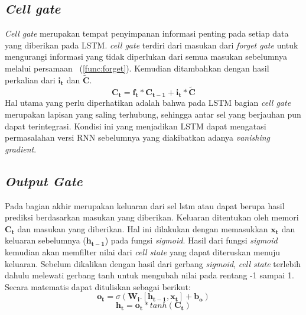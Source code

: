 \subsection{\textit{Cell gate}}
\textit{Cell gate} merupakan tempat penyimpanan informasi penting pada setiap data yang diberikan pada LSTM. \textit{cell gate} terdiri dari masukan dari \textit{forget gate} untuk mengurangi informasi yang tidak diperlukan dari semua masukan sebelumnya melalui persamaan ~(\ref{func:forget}). Kemudian ditambahkan dengan hasil perkalian dari $\boldsymbol{i_t}$ dan $\boldsymbol{\tilde{C}}$.
\begin{equation}
	\boldsymbol{C_t} = \boldsymbol{f_t}*\boldsymbol{C_{t-1}} + \boldsymbol{i_t} * \boldsymbol{\tilde{C}}
	\label{func:cell_gate}
\end{equation}
Hal utama yang perlu diperhatikan adalah bahwa pada LSTM bagian \textit{cell gate} merupakan lapisan yang saling terhubung, sehingga antar sel yang berjauhan pun dapat terintegrasi. Kondisi ini yang menjadikan LSTM dapat mengatasi permasalahan versi RNN sebelumnya yang diakibatkan adanya \textit{vanishing gradient}.
\subsection{\textit{Output Gate}}
Pada bagian akhir merupakan keluaran dari sel lstm atau dapat berupa hasil prediksi berdasarkan masukan yang diberikan. Keluaran ditentukan oleh memori $\boldsymbol{C_t}$ dan masukan yang diberikan. Hal ini dilakukan dengan memasukkan  $\boldsymbol{x_t}$ dan keluaran sebelumnya ($\boldsymbol{h_{t-1}}$) pada fungsi \textit{sigmoid}. Hasil dari fungsi \textit{sigmoid} kemudian akan memfilter nilai dari \textit{cell state} yang dapat diteruskan menuju keluaran. Sebelum dikalikan dengan hasil dari gerbang \textit{sigmoid}, \textit{cell state} terlebih dahulu melewati gerbang tanh untuk mengubah nilai pada rentang -1 sampai 1. Secara matematis dapat dituliskan sebagai berikut:
\begin{equation}
	\boldsymbol{o_t} = \sigma(\boldsymbol{W_i}.[\boldsymbol{h_{t-1}}, \boldsymbol{x_t}] + \boldsymbol{b_o})
	\label{func:ouput_sigmoid}
\end{equation}
\begin{equation}
	\boldsymbol{h_t} = \boldsymbol{o_t}*tanh(\boldsymbol{C_t})
	\label{func:final_output}
\end{equation}


